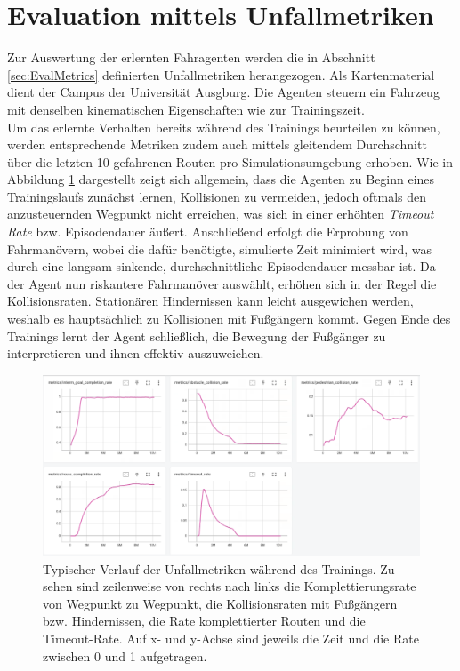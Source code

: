 
\section{Evaluation mittels Unfallmetriken}
Zur Auswertung der erlernten Fahragenten werden die in Abschnitt \ref{sec:EvalMetrics} definierten
Unfallmetriken herangezogen. Als Kartenmaterial dient der Campus der Universität Ausgburg.
Die Agenten steuern ein Fahrzeug mit denselben kinematischen Eigenschaften wie zur
Trainingszeit.\\

Um das erlernte Verhalten bereits während des Trainings
beurteilen zu können, werden entsprechende Metriken zudem auch mittels gleitendem Durchschnitt
über die letzten 10 gefahrenen Routen pro Simulationsumgebung erhoben. Wie in Abbildung
\ref{fig:TypicalCollRates} dargestellt zeigt sich allgemein, dass die Agenten zu Beginn eines
Trainingslaufs zunächst lernen, Kollisionen zu vermeiden, jedoch oftmals den anzusteuernden
Wegpunkt nicht erreichen, was sich in einer erhöhten \emph{Timeout Rate} bzw. Episodendauer äußert.
Anschließend erfolgt die Erprobung von Fahrmanövern, wobei die dafür benötigte, simulierte Zeit
minimiert wird, was durch eine langsam sinkende, durchschnittliche Episodendauer messbar ist.
Da der Agent nun riskantere Fahrmanöver auswählt, erhöhen sich in der Regel die Kollisionsraten.
Stationären Hindernissen kann leicht ausgewichen werden, weshalb es hauptsächlich zu Kollisionen
mit Fußgängern kommt. Gegen Ende des Trainings lernt der Agent schließlich, die Bewegung der
Fußgänger zu interpretieren und ihnen effektiv auszuweichen.\\

\begin{figure}[h]
  \centering
  \includegraphics[width = 1.0\textwidth]{imgs/unfallraten_typisches_beispiel}
  \caption{Typischer Verlauf der Unfallmetriken während des Trainings. Zu sehen
  sind zeilenweise von rechts nach links die Komplettierungsrate von Wegpunkt
  zu Wegpunkt, die Kollisionsraten mit Fußgängern bzw. Hindernissen, die Rate
  komplettierter Routen und die Timeout-Rate. Auf x- und y-Achse sind jeweils die Zeit
  und die Rate zwischen 0 und 1 aufgetragen.}
  \label{fig:TypicalCollRates}
\end{figure}

